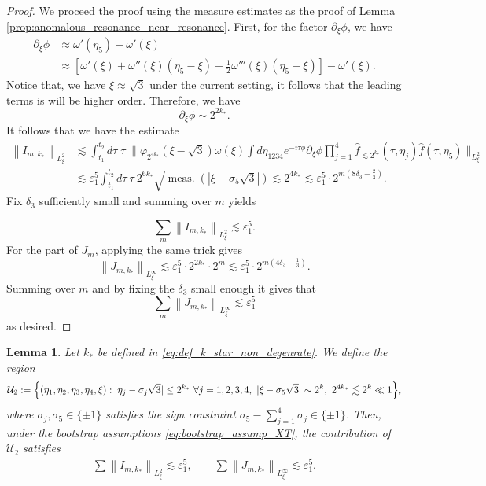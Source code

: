 \documentclass[reqno,english,11pt]{amsart}
\newcommand{\dd}{d}
\newcommand{\eps}{\varepsilon}
\newcommand{\snorm}[1]{\left\|#1\right\|}
\newtheorem{lemma}[theorem]{Lemma}
\theoremstyle{definition}
\numberwithin{equation}{section}
\begin{document}
\begin{proof}
We proceed the proof  using the measure estimates  as  the proof of Lemma  \ref{prop:anomalous_resonance_near_resonance}. First, for the factor $\partial_\xi \phi$, we have 
\begin{align*}
    \partial_\xi \phi&\approx \omega'(\eta_5)-\omega'(\xi)\\
    &\approx \left[\omega'(\xi)+\omega''(\xi)(\eta_5-\xi)+\frac{1}{2}\omega'''(\xi)(\eta_5-\xi)\right]-\omega'(\xi).
\end{align*}
Notice that, we have $\xi\approx \sqrt{3}$ under the current setting, it follows that the leading terms is will be higher order. Therefore, we have 
$$\partial_\xi\phi\sim 2^{2k_*}.$$
It follows that we have the estimate
\begin{align*}
    \snorm{I_{m,k_*}}_{L^2_\xi}&\lesssim \int^{t_2}_{t_1} \dd \tau\; \tau\; \Big\|\varphi_{2^{4k_*}}(\xi-\sqrt{3})\omega(\xi)\int d\eta_{1234}e^{-i\tau\phi}\partial_\xi \phi \prod^{4}_{j=1}\hat{f}_{\lesssim 2^{k_*}}(\tau,\eta_j)\hat{f}(\tau,\eta_5)\Big\|_{L^2_\xi}\\
    &\lesssim \eps_1^5\int^{t_2}_{t_1} \dd \tau\ \tau \ 2^{6k_*}\sqrt{\operatorname{meas.}(|\xi-\sigma_5\sqrt{3}|)\lesssim2^{4k_*}}\lesssim \eps_1^5\cdot 2^{m(8\delta_3-\frac{2}{3})}.
\end{align*}
Fix $\delta_3$ sufficiently small and summing over $m$ yields

$$\sum_{m}\snorm{I_{m,k_*}}_{L^2_\xi}\lesssim \eps_1^5.$$
For the part of $J_m$, applying the same trick gives
$$\snorm{J_{m,k_*}}_{L^\infty_\xi}\lesssim \eps_1^5\cdot 2^{2k_*}\cdot 2^m\lesssim \eps_1^5\cdot 2^{m(4\delta_3-\frac{1}{3})}.$$
Summing over $m$ and by fixing the $\delta_3$ small enough it gives that 
$$\sum_m \snorm{J_{m,k_*}}_{L^\infty_\xi}\lesssim \eps_1^5$$
as desired.
\end{proof}
\begin{lemma}\label{prop:nondeg_case_2}
Let $k_*$ be defined in \eqref{eq:def_k_star_non_degenrate}.
We define the region
$$\mathcal{U}_{2}:= \Bigl\{(\eta_1,\eta_2,\eta_3,\eta_4,\xi):|\eta_j-\sigma_j\sqrt{3}|\le 2^{k_*} \ \forall j=1,2,3,4,\ |\xi-\sigma_5\sqrt{3}|\sim 2^{k},\ 2^{4k_*}\lesssim 2^k\ll 1\Bigr\},$$
where $\sigma_j,\sigma_5\in\{\pm1\}$ satisfies the sign constraint
$\sigma_5-\sum_{j=1}^4\sigma_j\in\{\pm1\}$.
Then, under the bootstrap assumptions \eqref{eq:bootstrap_assump_XT}, the contribution of $\mathcal{U}_2$ satisfies
    \begin{align*}
        \sum\snorm{I_{m,k_*}}_{L^2_\xi}\lesssim \eps_1^5,\qquad \sum\snorm{J_{m,k_*}}_{L^\infty_\xi}\lesssim \eps_1^5.
    \end{align*}
\end{lemma}
\end{document}
